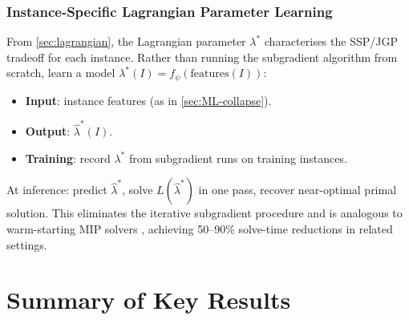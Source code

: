 \documentclass[11pt,a4paper]{article}
\theoremstyle{plain}
\theoremstyle{definition}
\begin{document}
\subsubsection{Instance-Specific Lagrangian Parameter Learning}
\label{sec:lambda-learning}

From \cref{sec:lagrangian}, the Lagrangian parameter $\lambda^*$ characterises the
SSP/JGP tradeoff for each instance. Rather than running the subgradient algorithm from
scratch, learn a model $\lambda^*(I) = f_\psi(\text{features}(I))$:
\begin{itemize}
  \item \textbf{Input}: instance features (as in \cref{sec:ML-collapse}).
  \item \textbf{Output}: $\hat{\lambda}^*(I)$.
  \item \textbf{Training}: record $\lambda^*$ from subgradient runs on training instances.
\end{itemize}
At inference: predict $\hat{\lambda}^*$, solve $L(\hat{\lambda}^*)$ in one pass,
recover near-optimal primal solution. This eliminates the iterative subgradient procedure
and is analogous to warm-starting MIP solvers \cite{Khalil2016},
achieving 50--90\% solve-time reductions in related settings.

\section{Summary of Key Results}
\label{sec:summary}
\end{document}
